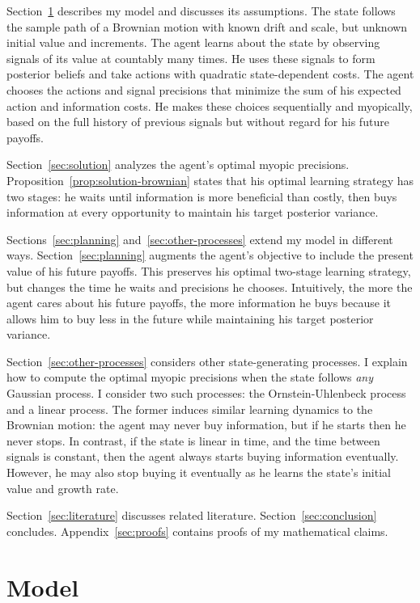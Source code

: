 \documentclass[11pt,oneside]{article}
\begin{document}
Section~\ref{sec:model} describes my model and discusses its assumptions.
The state follows the sample path of a Brownian motion with known drift and scale, but unknown initial value and increments.
The agent learns about the state by observing signals of its value at countably many times.
He uses these signals to form posterior beliefs and take actions with quadratic state-dependent costs.
The agent chooses the actions and signal precisions that minimize the sum of his expected action and information costs.
He makes these choices sequentially and myopically, based on the full history of previous signals but without regard for his future payoffs.

Section~\ref{sec:solution} analyzes the agent's optimal myopic precisions.
Proposition~\ref{prop:solution-brownian} states that his optimal learning strategy has two stages: he waits until information is more beneficial than costly, then buys information at every opportunity to maintain his target posterior variance.

Sections~\ref{sec:planning} and~\ref{sec:other-processes} extend my model in different ways.
Section~\ref{sec:planning} augments the agent's objective to include the present value of his future payoffs.
This preserves his optimal two-stage learning strategy, but changes the time he waits and precisions he chooses.
Intuitively, the more the agent cares about his future payoffs, the more information he buys because it allows him to buy less in the future while maintaining his target posterior variance.

Section~\ref{sec:other-processes} considers other state-generating processes.
I explain how to compute the optimal myopic precisions when the state follows \emph{any} Gaussian process.
I consider two such processes: the Ornstein-Uhlenbeck process and a linear process.
The former induces similar learning dynamics to the Brownian motion: the agent may never buy information, but if he starts then he never stops.
In contrast, if the state is linear in time, and the time between signals is constant, then the agent always starts buying information eventually.
However, he may also stop buying it eventually as he learns the state's initial value and growth rate.

Section~\ref{sec:literature} discusses related literature.
Section~\ref{sec:conclusion} concludes.
Appendix~\ref{sec:proofs} contains proofs of my mathematical claims.

\section{Model}
\label{sec:model}
\end{document}
